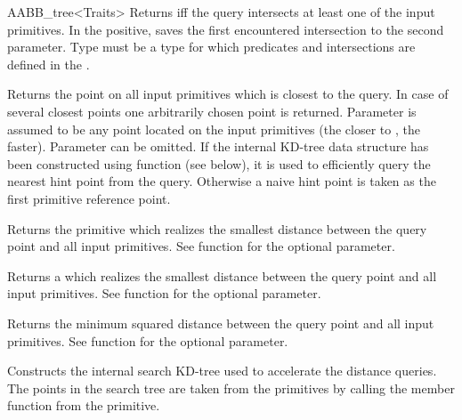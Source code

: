 \begin{ccRefClass}{AABB_tree<Traits>}
{Returns  iff the query intersects at least one of the input primitives. In the positive, saves the first encountered intersection to the second parameter. Type  must be a type for which  predicates and intersections are defined in the .}



{Returns the point on all input primitives which is closest to the query. In case of several closest points one arbitrarily chosen point is returned.  Parameter  is assumed to be any point located on the input primitives (the closer  to , the faster). Parameter  can be omitted. If the internal KD-tree data structure has been constructed using function  (see below), it is used to efficiently query the nearest hint point from the query. Otherwise a naive hint point is taken as the first primitive reference point. }

{Returns the primitive which realizes the smallest distance between the query point and all input primitives. See  function for the optional  parameter. }

{Returns a  which realizes the smallest distance between the query point and all input primitives. See  function for the optional  parameter. }

{Returns the minimum squared distance between the query point and all input primitives. See  function for the optional  parameter. }



{ Constructs the internal search KD-tree used to accelerate the distance queries. The points in the search tree are taken from the primitives by calling the member function  from the primitive.}


\end{ccRefClass}
